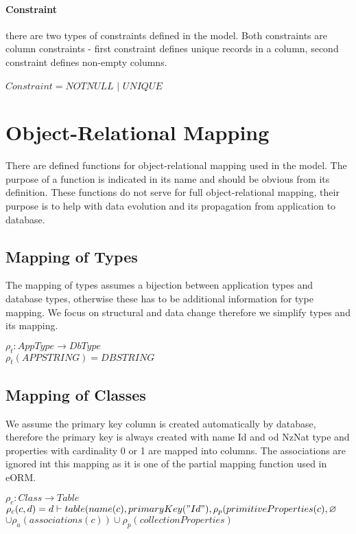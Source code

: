 \documentclass[11pt]{article}
\begin{document}
\paragraph{Constraint} there are two types of constraints defined in the model. Both constraints are column constraints - first constraint defines unique records in a column, second constraint defines non-empty columns.

\begin{center}
$Constraint = NOTNULL$ $|$ $UNIQUE $
\end{center}



\section{Object-Relational Mapping}
There are defined functions for object-relational mapping used in the model. The purpose of a function is indicated in its name and should be obvious from its definition. These functions do not serve for full object-relational mapping, their purpose is to help with data evolution and its propagation from application to database.


\subsection{Mapping of Types}
The mapping of types assumes a bijection between application types and database types, otherwise these has to be additional information for type mapping. We focus on structural and data change therefore we simplify types and its mapping.

\begin{center}
$ \rho_{t} : AppType \rightarrow DbType $ \\
$ \rho_{t}(APPSTRING) = DBSTRING $
\end{center}




\subsection{Mapping of Classes}
We assume the primary key column is created automatically by database, therefore the primary key is always created with name Id and od NzNat type and properties with cardinality 0 or 1 are mapped into columns. The associations are ignored int this mapping as it is one of the partial mapping function used in eORM.

\begin{center}
$\rho_{c}: Class \rightarrow Table $ \\ 
$\rho_{c}(c,d) = d \vdash table(name(c), primaryKey("Id"), \rho_{p}(primitiveProperties(c), \varnothing $\\$ \cup \rho_{a}(associations(c)) \cup \rho_{p}(collectionProperties)$
\end{center}
\end{document}
